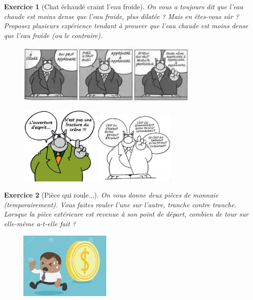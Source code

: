 \documentclass[12pt]{article}
\theoremstyle{break}
\newtheorem{exo}{Exercice}
\begin{document}
\begin{exo}[Chat échaudé craint l'eau froide]
On vous a toujours dit que l'eau chaude est moins dense que l'eau froide, plus dilatée ? Mais en êtes-vous sûr ? Proposez plusieurs expérience tendant à prouver que l'eau chaude est moins dense que l'eau froide (ou le contraire).

\begin{figure}[h!]
	\centering
    \includegraphics[width=0.8\textwidth]{LeChat1.jpg}
\end{figure}

\begin{figure}[h!]
	\centering
    \includegraphics[width=0.35\textwidth]{LeChat2.jpg}
    \includegraphics[width=0.35\textwidth]{LeChat3.jpg}
\end{figure}
\end{exo}


\begin{exo}[Pièce qui roule...]
On vous donne deux pièces de monnaie (temporairement). Vous faites rouler l'une sur l'autre, tranche contre tranche. Lorsque la pièce extérieure est revenue à son point de départ, combien de tour sur elle-même a-t-elle fait ?

\begin{figure}[h!]
	\centering
    \includegraphics[width=0.4\textwidth]{PieceDeMonnaie.jpg}
\end{figure}
\end{exo}
\end{document}
